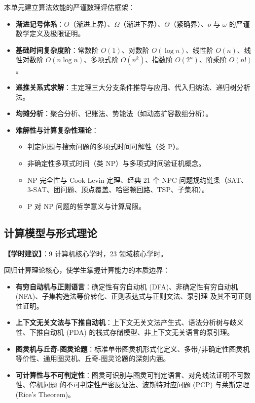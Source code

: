 本单元建立算法效能的严谨数理评估框架：
\begin{itemize}
    \item \textbf{渐进记号体系}：$O$（渐进上界）、$\Omega$（渐进下界）、$\Theta$（紧确界）、$o$ 与 $\omega$ 的严谨数学定义及极限证明。
    \item \textbf{基础时间复杂度阶}：常数阶 $O(1)$、对数阶 $O(\log n)$、线性阶 $O(n)$、线性对数阶 $O(n \log n)$、多项式阶 $O(n^k)$、指数阶 $O(2^n)$、阶乘阶 $O(n!)$。
    \item \textbf{递推关系式求解}：主定理三大分支条件推导与应用、代入归纳法、递归树分析法。
    \item \textbf{均摊分析}：聚合分析、记账法、势能法（如动态扩容数组分析）。
    \item \textbf{难解性与计算复杂性理论}：
    \begin{itemize}
        \item 判定问题与搜索问题的多项式时间可解性（类 P）。
        \item 非确定性多项式时间（类 NP）与多项式时间验证机概念。
        \item NP-完全性与 Cook-Levin 定理、经典 21 个 NPC 问题规约链条（SAT、3-SAT、团问题、顶点覆盖、哈密顿回路、TSP、子集和）。
        \item P 对 NP 问题的哲学意义与计算局限。
    \end{itemize}
\end{itemize}

\subsection{计算模型与形式理论}
\textbf{【学时建议】}：9 计算机核心学时，23 领域核心学时。

回归计算理论核心，使学生掌握计算能力的本质边界：
\begin{itemize}
    \item \textbf{有穷自动机与正则语言}：确定性有穷自动机 (DFA)、非确定性有穷自动机 (NFA)、子集构造法等价转化、正则表达式与正则文法、泵引理 及其不可正则性证明。
    \item \textbf{上下文无关文法与下推自动机}：上下文无关文法产生式、语法分析树与歧义性、下推自动机 (PDA) 的栈式存储模型、非上下文无关语言的泵引理。
    \item \textbf{图灵机与丘奇-图灵论题}：标准单带图灵机形式化定义、多带/非确定性图灵机等价性、通用图灵机、丘奇-图灵论题的深刻内涵。
    \item \textbf{可计算性与不可判定性}：图灵可识别与图灵可判定语言、对角线法证明不可数性、停机问题 的不可判定性严密反证法、波斯特对应问题 (PCP) 与莱斯定理 (Rice's Theorem)。
\end{itemize}

